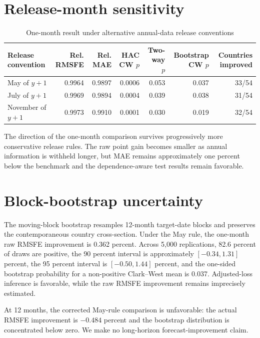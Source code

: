 \documentclass[12pt]{article}
\begin{document}
\section{Release-month sensitivity}
\begin{table}[htbp]
\centering\scriptsize
\caption{One-month result under alternative annual-data release conventions}
\begin{tabular}{lrrrrrr}
\toprule
Release convention & Rel. RMSFE & Rel. MAE & HAC CW $p$ & Two-way $p$ & Bootstrap CW $p$ & Countries improved\\
\midrule
May of $y+1$ & 0.9964 & 0.9897 & 0.0006 & 0.053 & 0.037 & 33/54\\
July of $y+1$ & 0.9969 & 0.9894 & 0.0004 & 0.039 & 0.038 & 31/54\\
November of $y+1$ & 0.9973 & 0.9910 & 0.0001 & 0.030 & 0.019 & 32/54\\
\bottomrule
\end{tabular}
\end{table}

The direction of the one-month comparison survives progressively more conservative release rules. The raw point gain becomes smaller as annual information is withheld longer, but MAE remains approximately one percent below the benchmark and the dependence-aware test results remain favorable.

\section{Block-bootstrap uncertainty}
The moving-block bootstrap resamples 12-month target-date blocks and preserves the contemporaneous country cross-section. Under the May rule, the one-month raw RMSFE improvement is 0.362 percent. Across 5,000 replications, 82.6 percent of draws are positive, the 90 percent interval is approximately $[-0.34,1.31]$ percent, the 95 percent interval is $[-0.50,1.44]$ percent, and the one-sided bootstrap probability for a non-positive Clark--West mean is 0.037. Adjusted-loss inference is favorable, while the raw RMSFE improvement remains imprecisely estimated.

At 12 months, the corrected May-rule comparison is unfavorable: the actual RMSFE improvement is $-0.484$ percent and the bootstrap distribution is concentrated below zero. We make no long-horizon forecast-improvement claim.
\end{document}
